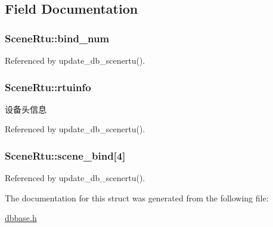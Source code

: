 \subsection{Field Documentation}
\hypertarget{structSceneRtu_aa094ff659f108ee77a08b35bcba85bb6}{
\subsubsection[{bind\-\_\-num}]{ Scene\-Rtu\-::bind\-\_\-num}}\label{structSceneRtu_aa094ff659f108ee77a08b35bcba85bb6}


Referenced by update\-\_\-db\-\_\-scenertu().

\hypertarget{structSceneRtu_a8850884f48b4d42495efce8ba6cdab7b}{
\subsubsection[{rtuinfo}]{ Scene\-Rtu\-::rtuinfo}}\label{structSceneRtu_a8850884f48b4d42495efce8ba6cdab7b}


设备头信息 



Referenced by update\-\_\-db\-\_\-scenertu().

\hypertarget{structSceneRtu_a308c1e20b977bbfcf203751cecac8e2f}{
\subsubsection[{scene\-\_\-bind}]{ Scene\-Rtu\-::scene\-\_\-bind\mbox{[}4\mbox{]}}}\label{structSceneRtu_a308c1e20b977bbfcf203751cecac8e2f}


Referenced by update\-\_\-db\-\_\-scenertu().



The documentation for this struct was generated from the following file\-:\begin{DoxyCompactItemize}
\item 
\hyperlink{dbbase_8h}{dbbase.\-h}\end{DoxyCompactItemize}
